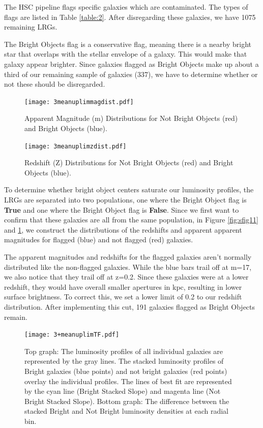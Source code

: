 \documentclass[apj]{emulateapj}
\begin{document}
The HSC pipeline flags specific galaxies which are contaminated. The types of flags are listed in Table \ref{table:2}.  After disregarding these galaxies, we have 1075 remaining LRGs.

The Bright Objects flag is a conservative flag, meaning there is a nearby bright star that overlaps with the stellar envelope of a galaxy. This would make that galaxy appear brighter. Since galaxies flagged as Bright Objects make up about a third of our remaining sample of galaxies (337), we have to determine whether or not these should be disregarded. 

\begin{figure}[htp!]
\centering
\begin{minipage}[b]{0.45\linewidth}
  \texttt{[image: 3meanuplimmagdist.pdf]}
  \caption{\scriptsize{Apparent Magnitude (m) Distributions for Not Bright Objects (red) and Bright Objects (blue).}}
  \label{fig:sfig11}
\end{minipage}
\quad
\begin{minipage}[b]{0.45\linewidth}
 \texttt{[image: 3meanuplimzdist.pdf]}
  \caption{\scriptsize{Redshift (Z) Distributions for Not Bright Objects (red) and Bright Objects (blue).}}
  \label{fig:sfig12}
\end{minipage}
\end{figure}

To determine whether bright object centers saturate our luminosity profiles, the LRGs are separated into two populations, one where the Bright Object flag is \textbf{True} and one where the Bright Object flag is \textbf{False}. Since we first want to confirm that these galaxies are all from the same population, in Figure \ref{fig:sfig11} and \ref{fig:sfig12}, we construct the distributions of the redshifts and apparent apparent magnitudes for flagged (blue) and not flagged (red) galaxies. 

The apparent magnitudes and redshifts for the flagged galaxies aren't normally distributed like the non-flagged galaxies. While the blue bars trail off at m=17, we also notice that they trail off at z=0.2. Since these galaxies were at a lower redshift, they would have overall smaller apertures in kpc, resulting in lower surface brightness. To correct this, we set a lower limit of 0.2 to our redshift distribution.  After implementing this cut, 191 galaxies flagged as Bright Objects remain.

\begin{figure}[h]
\centering
\texttt{[image: 3+meanuplimTF.pdf]}
\caption{Top graph: The luminosity profiles of all individual galaxies are represented by the gray lines. The stacked luminosity profiles of Bright galaxies (blue points) and not bright galaxies (red points) overlay the individual profiles. The lines of best fit are represented by the cyan line (Bright Stacked Slope) and magenta line (Not Bright Stacked Slope). Bottom graph: The difference between the stacked Bright and Not Bright luminosity densities at each radial bin.}
\label{fig:mesh1}
\end{figure}
\end{document}
